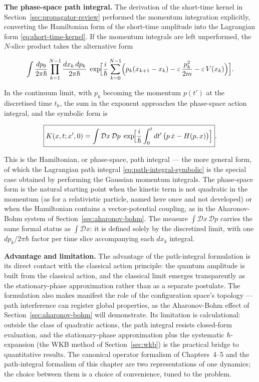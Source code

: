 \medskip\noindent\textbf{The phase-space path integral.} The derivation of the short-time kernel in Section~\ref{sec:propagator-review} performed the momentum integration explicitly, converting the Hamiltonian form of the short-time amplitude into the Lagrangian form \eqref{eq:short-time-kernel}. If the momentum integrals are left unperformed, the $N$-slice product takes the alternative form
\begin{linenomath}
\begin{equation}
\int \frac{dp_0}{2\pi\hbar}\prod_{k=1}^{N-1}\frac{dx_k\,dp_k}{2\pi\hbar}\;
\exp\!\Bigl[\frac{i}{\hbar}\sum_{k=0}^{N-1}
\Bigl(p_k(x_{k+1}-x_k) - \varepsilon\,\frac{p_k^2}{2m}
- \varepsilon\,V(x_k)\Bigr)\Bigr] .
\end{equation}
\end{linenomath}
In the continuum limit, with $p_k$ becoming the momentum $p(t')$ at the discretised time $t_k$, the sum in the exponent approaches the phase-space action integral, and the symbolic form is
\begin{linenomath}
\begin{equation}
\boxed{K(x,t;x',0) = \int \mathcal{D}x\,\mathcal{D}p\;
\exp\!\Bigl[\frac{i}{\hbar}\int_0^t dt'\,
\bigl(p\,\dot{x} - H(p,x)\bigr)\Bigr]} .
\label{eq:phase-space-path-integral}
\end{equation}
\end{linenomath}
This is the Hamiltonian, or phase-space, path integral --- the more general form, of which the Lagrangian path integral \eqref{eq:path-integral-symbolic} is the special case obtained by performing the Gaussian momentum integrals. The phase-space form is the natural starting point when the kinetic term is not quadratic in the momentum (as for a relativistic particle, named here once and not developed) or when the Hamiltonian contains a vector-potential coupling, as in the Aharonov-Bohm system of Section~\ref{sec:aharonov-bohm}. The measure $\int\mathcal{D}x\,\mathcal{D}p$ carries the same formal status as $\int\mathcal{D}x$: it is defined solely by the discretized limit, with one $dp_k/2\pi\hbar$ factor per time slice accompanying each $dx_k$ integral.

\medskip\noindent\textbf{Advantage and limitation.} The advantage of the path-integral formulation is its direct contact with the classical action principle: the quantum amplitude is built from the classical action, and the classical limit emerges transparently as the stationary-phase approximation rather than as a separate postulate. The formulation also makes manifest the role of the configuration space's topology --- path interference can register global properties, as the Aharonov-Bohm effect of Section~\ref{sec:aharonov-bohm} will demonstrate. Its limitation is calculational: outside the class of quadratic actions, the path integral resists closed-form evaluation, and the stationary-phase approximation plus the systematic $\hbar$-expansion (the WKB method of Section~\ref{sec:wkb}) is the practical bridge to quantitative results. The canonical operator formalism of Chapters~4--5 and the path-integral formalism of this chapter are two representations of one dynamics; the choice between them is a choice of convenience, tuned to the problem.

